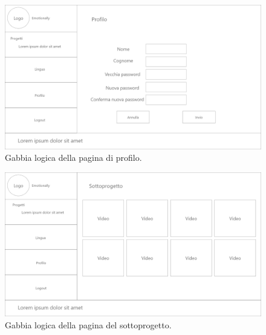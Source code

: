 \begin{figure}[H]
	\centering
	\caption{Gabbia logica della pagina di profilo.}
	\label{fig:gabbie-logiche:profilo}
	\includegraphics[width=\textwidth]{images/gabbie-logiche/Profilo}
\end{figure}

\begin{figure}[H]
	\centering
	\caption{Gabbia logica della pagina del sottoprogetto.}
	\label{fig:gabbie-logiche:sottoprogetto}
	\includegraphics[width=\textwidth]{images/gabbie-logiche/Sottoprogetto}
\end{figure}
